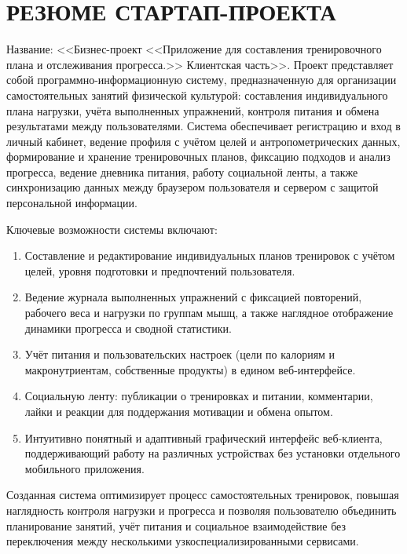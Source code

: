 \newpage
\section*{РЕЗЮМЕ СТАРТАП-ПРОЕКТА}


Название: <<Бизнес-проект <<Приложение для составления тренировочного плана и отслеживания прогресса.>> Клиентская часть>>. Проект представляет собой программно-информационную систему, предназначенную для организации самостоятельных занятий физической культурой: составления индивидуального плана нагрузки, учёта выполненных упражнений, контроля питания и обмена результатами между пользователями. Система обеспечивает регистрацию и вход в личный кабинет, ведение профиля с учётом целей и антропометрических данных, формирование и хранение тренировочных планов, фиксацию подходов и анализ прогресса, ведение дневника питания, работу социальной ленты, а также синхронизацию данных между браузером пользователя и сервером с защитой персональной информации.

Ключевые возможности системы включают:
\begin{enumerate}
	\item Составление и редактирование индивидуальных планов тренировок с учётом целей, уровня подготовки и предпочтений пользователя.
	
	\item Ведение журнала выполненных упражнений с фиксацией повторений, рабочего веса и нагрузки по группам мышц, а также наглядное отображение динамики прогресса и сводной статистики.
	
	\item Учёт питания и пользовательских настроек (цели по калориям и макронутриентам, собственные продукты) в едином веб-интерфейсе.
	
	\item Социальную ленту: публикации о тренировках и питании, комментарии, лайки и реакции для поддержания мотивации и обмена опытом.
	
	\item Интуитивно понятный и адаптивный графический интерфейс веб-клиента, поддерживающий работу на различных устройствах без установки отдельного мобильного приложения.
\end{enumerate}

Созданная система оптимизирует процесс самостоятельных тренировок, повышая наглядность контроля нагрузки и прогресса и позволяя пользователю объединить планирование занятий, учёт питания и социальное взаимодействие без переключения между несколькими узкоспециализированными сервисами.

